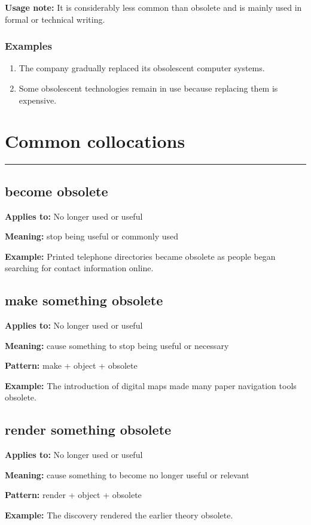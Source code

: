 \documentclass[11pt]{article}
\newcommand{\sectionrule}{\par\vspace{-0.5em}\noindent\textcolor{Accent}{\rule{\linewidth}{0.6pt}}\par}
\begin{document}
\textbf{Usage note:} It is considerably less common than obsolete and is mainly used in formal or technical writing.

\subsubsection{Examples}
\begin{enumerate}
  \item The company gradually replaced its obsolescent computer systems.
  \item Some obsolescent technologies remain in use because replacing them is expensive.
\end{enumerate}

\section{Common collocations}
\sectionrule
\subsection{become obsolete}
\textbf{Applies to:} No longer used or useful

\textbf{Meaning:} stop being useful or commonly used

\textbf{Example:} Printed telephone directories became obsolete as people began searching for contact information online.

\subsection{make something obsolete}
\textbf{Applies to:} No longer used or useful

\textbf{Meaning:} cause something to stop being useful or necessary

\textbf{Pattern:} make + object + obsolete

\textbf{Example:} The introduction of digital maps made many paper navigation tools obsolete.

\subsection{render something obsolete}
\textbf{Applies to:} No longer used or useful

\textbf{Meaning:} cause something to become no longer useful or relevant

\textbf{Pattern:} render + object + obsolete

\textbf{Example:} The discovery rendered the earlier theory obsolete.
\end{document}
